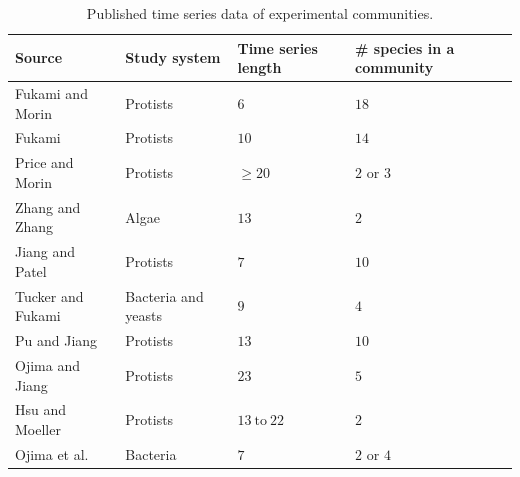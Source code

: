 \documentclass[12pt, class=article, crop=false]{standalone}
\begin{document}
\begin{table}
    \flushleft
    \caption{Published time series data of experimental communities.}
    \begin{tabular}{llll}
         Source & Study system & Time series length & \# species in a community\\
         \hline
         Fukami and Morin \citep{fukami_productivity-biodiversity_2003} & Protists & $6$ & $18$\\
         Fukami \citep{fukami_assembly_2004} & Protists & $10$ & $14$\\
         Price and Morin \citep{price_colonization_2004} & Protists & $\ge 20$ & $2$ or $3$ \\
         Zhang and Zhang \citep{zhang_colonization_2007} & Algae & $13$ & $2$\\
         Jiang and Patel \citep{jiang_community_2008} & Protists & $7$ & $10$\\
         Tucker and Fukami \citep{tucker_environmental_2014} & Bacteria and yeasts & $9$ & $4$\\
         Pu and Jiang \citep{pu_dispersal_2015} & Protists & $13$ & $10$\\
         Ojima and Jiang \citep{ojima_interactive_2017} & Protists & $23$ & $5$\\
         Hsu and Moeller \citep{hsu_metabolic_2021} & Protists & $13~\mbox{to}~22$ & $2$\\
         Ojima et al. \citep{ojima_priority_2022} & Bacteria & $7$ & $2$ or $4$\\
         \hline
    \end{tabular}
    \label{tab:expdata}
\end{table}
\end{document}
